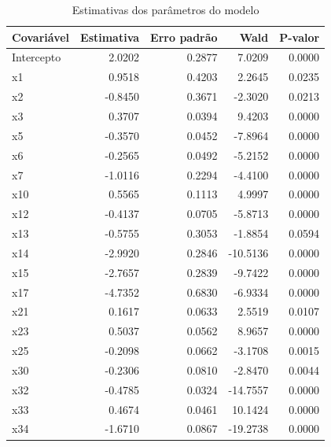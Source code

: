 \documentclass[twocolumn]{rbef}
\newcommand{\1}{\mathbbm{1}}
\begin{document}
\begin{table}

\caption{\label{tab:coefs}Estimativas dos parâmetros do modelo}
\centering
\fontsize{9}{11}\selectfont
\begin{tabular}[t]{lrrrr}
\toprule
Covariável & Estimativa & Erro padrão & Wald & P-valor\\
\midrule
Intercepto & 2.0202 & 0.2877 & 7.0209 & 0.0000\\
x1 & 0.9518 & 0.4203 & 2.2645 & 0.0235\\
x2 & -0.8450 & 0.3671 & -2.3020 & 0.0213\\
x3 & 0.3707 & 0.0394 & 9.4203 & 0.0000\\
x5 & -0.3570 & 0.0452 & -7.8964 & 0.0000\\
\addlinespace
x6 & -0.2565 & 0.0492 & -5.2152 & 0.0000\\
x7 & -1.0116 & 0.2294 & -4.4100 & 0.0000\\
x10 & 0.5565 & 0.1113 & 4.9997 & 0.0000\\
x12 & -0.4137 & 0.0705 & -5.8713 & 0.0000\\
x13 & -0.5755 & 0.3053 & -1.8854 & 0.0594\\
\addlinespace
x14 & -2.9920 & 0.2846 & -10.5136 & 0.0000\\
x15 & -2.7657 & 0.2839 & -9.7422 & 0.0000\\
x17 & -4.7352 & 0.6830 & -6.9334 & 0.0000\\
x21 & 0.1617 & 0.0633 & 2.5519 & 0.0107\\
x23 & 0.5037 & 0.0562 & 8.9657 & 0.0000\\
\addlinespace
x25 & -0.2098 & 0.0662 & -3.1708 & 0.0015\\
x30 & -0.2306 & 0.0810 & -2.8470 & 0.0044\\
x32 & -0.4785 & 0.0324 & -14.7557 & 0.0000\\
x33 & 0.4674 & 0.0461 & 10.1424 & 0.0000\\
x34 & -1.6710 & 0.0867 & -19.2738 & 0.0000\\
\bottomrule
\end{tabular}
\end{table}
\end{document}
